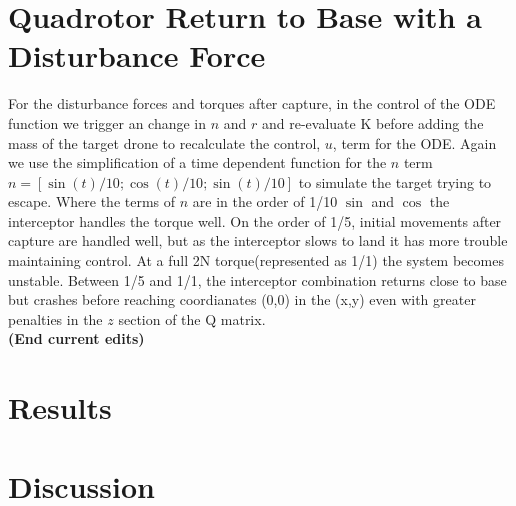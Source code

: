 \documentclass{article}
\begin{document}
\begin{multicols}{2}
\bigskip
\section*{Quadrotor Return to Base with a Disturbance Force}
For the disturbance forces and torques after capture,  in the control of the ODE function we trigger an change in $n$ and $r$ and re-evaluate K before adding the mass of the target drone to recalculate the control, $u$, term for the ODE.  Again we use the simplification of a time dependent function for the $n$ term $n=[\sin(t)/10; \cos(t)/10; \sin(t)/10]$ to simulate the target trying to escape.  Where the terms of $n$ are in the order of 1/10 $\sin$ and $\cos$ the interceptor handles the torque well.  On the order of 1/5, initial movements after capture are handled well, but as the interceptor slows to land it has more trouble maintaining control.  At a full 2N torque(represented as 1/1) the system becomes unstable. Between 1/5 and 1/1, the interceptor combination returns close to base but crashes before reaching coordianates (0,0) in the (x,y) even with greater penalties in the $z$ section of the Q matrix.\\
  
\textbf{(End current edits)}
\section*{Results}
\section*{Discussion}


\end{multicols}
\end{document}
